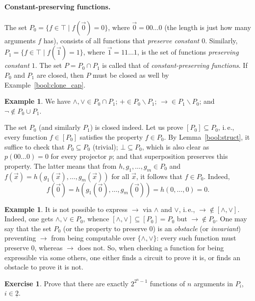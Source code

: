 \documentclass[12pt,notitlepage]{article}
\theoremstyle{plain}
\theoremstyle{definition}
\newtheorem{exc}[thm]{Exercise}
\newtheorem{exm}[thm]{Example}
\theoremstyle{plain}
\newcommand{\sbs}{\subseteq}
\renewcommand{\setminus}{\smallsetminus}
\newcommand{\ul}[1]{\underline{#1}}
\newcommand{\1}{\mathbf{1}}
\newcommand{\0}{\mathbf{0}}
\begin{document}
\paragraph{Constant-preserving functions.}
The set $P_0 = \{ f \in \top \mid f(\vec 0) = 0\}$, where $\vec 0 = 00\ldots0$ (the length is just how many arguments $f$ has), consists of all functions that \emph{preserve constant $0$}. Similarly, $P_1 = \{ f \in \top \mid f(\vec 1) = 1\}$,  where $\vec 1 = 11\ldots1$, is the set of functions \emph{preserving constant $1$}. The set $P = P_0 \cap P_1$ is called that of \emph{constant-preserving functions}. If $P_0$ and $P_1$ are closed, then $P$ must be closed as well by Example~\ref{bool:clone_cap}.

\begin{exm}
We have ${\wedge}, {\vee} \in P_0 \cap P_1$; ${+} \in P_0 \setminus P_1$; ${\to} \in P_1 \setminus P_0$; and $\neg \notin P_0 \cup P_1$.
\end{exm}

The set $P_0$ (and similarly $P_1$) is closed indeed. Let us prove $[P_0] \sbs P_0$, i.\,e., every function $f \in [P_0]$ satisfies the property $f \in P_0$. By Lemma~\ref{bool:struct}, it suffice to check that $P_0 \sbs P_0$ (trivial); $\bot \sbs P_0$, which is also clear as $p(00\ldots0) = 0$ for every projector $p$; and that superposition preserves this property. The latter means that from $h, g_1, \ldots,g_m \in P_0$ and $f(\vec x) = h(g_1(\vec x),\ldots, g_m(\vec x))$ for all $\vec x$, it follows that $f \in P_0$. Indeed,
$$f(\vec 0) = h(g_1(\vec 0),\ldots, g_m(\vec 0)) = h(0, \ldots, 0) = 0.$$

\begin{exm}
It is not possible to express ${\to}$ via ${\wedge}$ and ${\vee}$, i.\,e., ${\to} \notin [{\wedge}, {\vee}]$. Indeed, one gets ${\wedge}, {\vee} \in P_0$, whence $[{\wedge}, {\vee}] \sbs [P_0] = P_0$ but ${\to} \notin P_0$. One may say that the set $P_0$ (or the property to preserve $0$) is an \emph{obstacle} (or \emph{invariant}) preventing ${\to}$ from being computable over $\{{\wedge}, {\vee}\}$: every such function must preserve $0$, whereas ${\to}$ does not. So, when checking a function for being expressible via some others, one either finds a circuit to prove it is, or finds an obstacle to prove it is not. 
\end{exm}
\begin{exc}
Prove that there are exactly $2^{2^n - 1}$ functions of $n$ arguments in $P_i$, $i \in \ul{2}$.
\end{exc}
\end{document}
